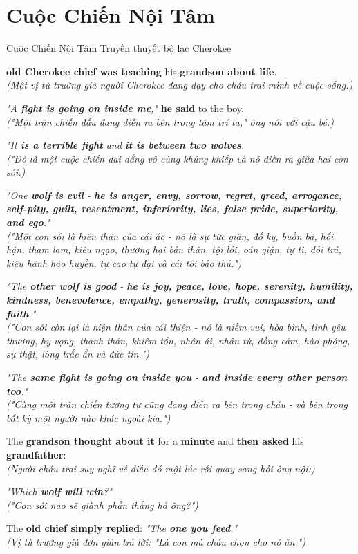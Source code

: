 \section{Cuộc Chiến Nội Tâm}
\begin{truyen}{Cuộc Chiến Nội Tâm}%
              {Truyền thuyết bộ lạc Cherokee}

 \textbf{old Cherokee chief was teaching} his \textbf{grandson about life}.\\
\textit{(Một vị tù trưởng già người Cherokee đang dạy cho cháu trai mình về cuộc sống.)}

\textit{"A \textbf{fight is going on inside me},"} \textbf{he said} to the boy.\\
\textit{("Một trận chiến đấu đang diễn ra bên trong tâm trí ta," ông nói với cậu bé.)}

\textit{"It \textbf{is a terrible fight} and \textbf{it is between two wolves}.}\\
\textit{("Đó là một cuộc chiến dai dẳng vô cùng khủng khiếp và nó diễn ra giữa hai con sói.)}

\textit{"One \textbf{wolf is evil} - \textbf{he is anger, envy, sorrow, regret, greed, arrogance, self-pity, guilt, resentment, inferiority, lies, false pride, superiority, and ego}."}\\
\textit{("Một con sói là hiện thân của cái ác - nó là sự tức giận, đố kỵ, buồn bã, hối hận, tham lam, kiêu ngạo, thương hại bản thân, tội lỗi, oán giận, tự ti, dối trá, kiêu hãnh hão huyền, tự cao tự đại và cái tôi bảo thủ.")}

\textit{"The \textbf{other wolf is good} - \textbf{he is joy, peace, love, hope, serenity, humility, kindness, benevolence, empathy, generosity, truth, compassion, and faith}."}\\
\textit{("Con sói còn lại là hiện thân của cái thiện - nó là niềm vui, hòa bình, tình yêu thương, hy vọng, thanh thản, khiêm tốn, nhân ái, nhân từ, đồng cảm, hào phóng, sự thật, lòng trắc ẩn và đức tin.")}

\textit{"The \textbf{same fight is going on inside you} - \textbf{and inside every other person too}."}\\
\textit{("Cùng một trận chiến tương tự cũng đang diễn ra bên trong cháu - và bên trong bất kỳ một người nào khác ngoài kia.")}

The \textbf{grandson thought about it} for a \textbf{minute} and \textbf{then asked} his \textbf{grandfather}:\\
\textit{(Người cháu trai suy nghĩ về điều đó một lúc rồi quay sang hỏi ông nội:)}

\textit{"Which \textbf{wolf will win}?"}\\
\textit{("Con sói nào sẽ giành phần thắng hả ông?")}

The \textbf{old chief simply replied}: \textit{"The \textbf{one you feed}."}\\
\textit{(Vị tù trưởng già đơn giản trả lời: "Là con mà cháu chọn cho nó ăn.")}
\end{truyen}

